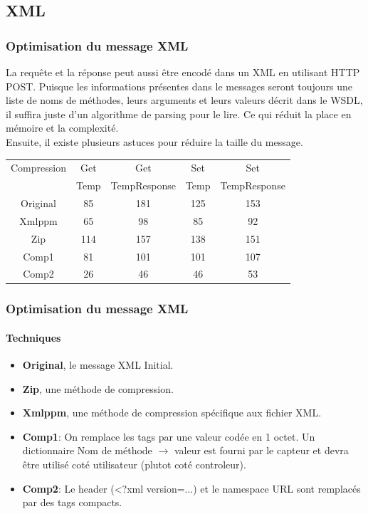 \subsection{XML}
\begin{frame}
 \frametitle{Optimisation du message XML}
 La requête et la réponse peut aussi être encodé dans un XML en utilisant HTTP POST.
 Puisque les informations présentes dans le messages seront toujours une liste de noms de méthodes, leurs arguments et leurs valeurs décrit dans le WSDL, il suffira juste d'un algorithme de parsing pour le lire.
 Ce qui réduit la place en mémoire et la complexité.\\
 \vspace{4mm}
 Ensuite, il existe plusieurs astuces pour réduire la taille du message.\\
 \begin{center}
  \begin{tabular}{|c|c|c|c|c|}
   \hline
   Compression & Get & Get & Set & Set\\
   ~ & Temp & TempResponse & Temp & TempResponse\\
   \hline
   Original & 85 & 181 & 125 & 153\\
   \hline
   Xmlppm & 65 & 98 & 85 & 92\\
   Zip & 114 & 157 & 138 & 151\\
   \hline
   Comp1 & 81 & 101 & 101 & 107\\
   Comp2 & 26 & 46 & 46 & 53\\
   \hline
  \end{tabular}
 \end{center}
\end{frame}

\begin{frame}
 \frametitle{Optimisation du message XML}
 \framesubtitle{Techniques}
 \begin{itemize}
  \item \textbf{Original}, le message XML Initial.
  \item \textbf{Zip}, une méthode de compression.
  \item \textbf{Xmlppm}, une méthode de compression spécifique aux fichier XML.
  \item \textbf{Comp1}: On remplace les tags par une valeur codée en 1 octet.
  Un dictionnaire Nom de méthode $\rightarrow$ valeur est fourni par le capteur et devra être utilisé coté utilisateur (plutot coté controleur).
  \item \textbf{Comp2}: Le header (<?xml version=...) et le namespace URL sont remplacés par des tags compacts.
 \end{itemize}
\end{frame}
